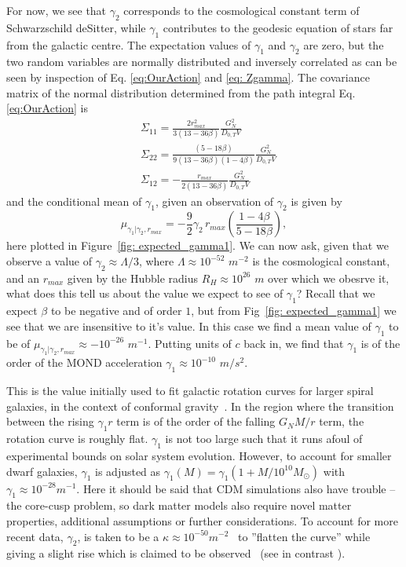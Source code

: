 \documentclass[aps,pra,amsmath,amssymb,amsthm,floatfix,nofootinbib,notitlepage,superscriptaddress,10pt]{revtex4-2}
\begin{document}
For now, we see that $\gamma_2$ corresponds to the cosmological constant term of Schwarzschild deSitter, while $\gamma_1$ contributes to the geodesic equation of stars far from the galactic centre. The expectation values of $\gamma_1$ and $\gamma_2$ are zero, but the two random variables are normally distributed and inversely correlated as can be seen by inspection of Eq. \eqref{eq:OurAction} and \eqref{eq: Zgamma}. The covariance matrix of the normal distribution determined from the path integral Eq. \eqref{eq:OurAction} is 
\begin{align}
    &\Sigma_{11}=\frac{2  r_{max}^2}{3 (13-36 \beta)}\frac{G_N^2}{D_{0,T} V}  \nonumber\\
    &\Sigma_{22}= \frac{(5-18\beta)}{9(13-36 \beta ) (1-4 \beta ) }\frac{G_N^2}{D_{0,T} V} \nonumber\\
    &\Sigma_{12} = -\frac{ r_{max}}{2 (13-36 \beta)}\frac{G_N^2}{D_{0,T} V} 
    \label{eq: CovarianceMatrix-main}
\end{align}
and the conditional mean of $\gamma_1$, given an observation of $\gamma_2$ is given by
\begin{equation}
\label{eq: Conditional_mean-main}
    \mu_{\gamma_1|\gamma_2,r_{max}}
    =-\frac{9}{2}\gamma_2\, r_{max}\left(\frac{1-4 \beta }{5-18 \beta}\right),
\end{equation}
here plotted in Figure~\ref{fig: expected_gamma1}. 
We can now ask, given that we observe a value of $\gamma_2\approx\Lambda/3$, where $\Lambda\approx 10^{-52}$ $m^{-2}$ is the cosmological constant, and an $r_{max}$ given by the Hubble radius $R_H\approx 10^{26}$ $m$ over which we obesrve it, what does this tell us about the value we expect to see of $\gamma_1$? Recall that we expect $\beta$ to be negative and of order $1$, but from Fig~\ref{fig: expected_gamma1} we see that we are insensitive to it's value. In this case we find a mean value of $\gamma_1$ to be of $\mu_{\gamma_1|\gamma_2,r_{max}}\approx -10^{-26}$ $m^{-1}$. Putting units of $c$ back in, we find that $\gamma_1$ is of the order of the MOND acceleration $\gamma_1 \approx 10^{-10}$ $m/s^2$.

This is the value initially used to fit galactic rotation curves for larger spiral galaxies, in the context of conformal gravity~\cite{mannheim1989exact}.
In the region where the transition between the rising $\gamma_1 r$ term is of the order of the falling $G_NM/r$ term, the rotation curve is roughly flat. $\gamma_1$ is not too large such that it runs afoul of experimental bounds on solar system evolution. However, to account for smaller dwarf galaxies,  $\gamma_1$ is adjusted as $\gamma_1(M)=\gamma_1(1+M/10^{10} M_{\odot})$ with $\gamma_1\approx 10^{-28} m^{-1}$. Here it should be said that CDM simulations also have trouble -- the core-cusp problem\cite{moore1994evidence,deBlok:2009sp,oh2015high}, so dark matter models also require novel matter properties, additional assumptions or further considerations\cite{pontzen2014cold}. To account for more recent data, $\gamma_2$, is taken to be a $\kappa \approx 10^{-50} m^{-2}$~\cite{mannheim2012fitting} to ''flatten the curve'' while giving a slight rise which is claimed to be observed~\cite{OBrien:2011vks} (see in contrast \cite{Brouwer:2021nsr}).
\end{document}
